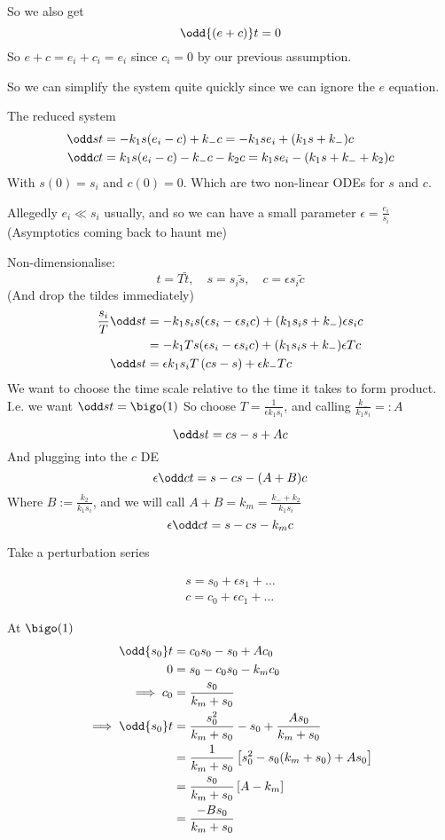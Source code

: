 \documentclass{X:/Documents/Coding/Latex/myassignment}
\begin{document}
So we also get
\[\odd{(e+c)}t = 0 \]
So $e+c = e_i+c_i = e_i$ since $c_i = 0$ by our previous assumption.

So we can simplify the system quite quickly since we can ignore the $e$ equation.


The reduced system 
\begin{align*}
	\odd st & = -k_1 s (e_i-c) + k_- c = -k_1 se_i + (k_1 s + k_-)c\\
	\odd ct & = k_1 s (e_i-c) - k_- c - k_2c = k_1 se_i - (k_1 s + k_- + k_2)c\\
\end{align*}
With $s(0) = s_i$ and $c(0) = 0$.
Which are two non-linear ODEs for $s$ and $c$.

Allegedly $e_i \ll s_i$ usually, and so we can have a small parameter $\epsilon = \frac{e_i}{s_i}$ (Asymptotics coming back to haunt me)

Non-dimensionalise:
\[t = T \tilde{t},\quad s = s_i \tilde{s}, \quad c = \epsilon s_i \tilde{c}\]
(And drop the tildes immediately)
\begin{align*}
	\frac{s_i}{T}\odd st & = -k_1 s_i s(\epsilon s_i - \epsilon s_i c) + (k_1 s_i s + k_-) \epsilon s_i c\\
	& = -k_1 T s(\epsilon s_i - \epsilon s_i c) + (k_1 s_i s + k_-) \epsilon T c\\
	\odd st &= \epsilon k_1 s_i T\left(c s - s\right) + \epsilon k_- T c
\end{align*}
We want to choose the time scale relative to the time it takes to form product. I.e. we want $\odd st = \bigo(1)$ 
So choose $T = \frac1{\epsilon k_1 s_i}$, and calling $\frac{k_-}{k_1 s_i} =:A$

\[\odd st = cs -s + A c\]
And plugging into the $c$ DE 
\[\epsilon\odd ct = s - cs - (A+B)c\]
Where $B := \frac{k_2}{k_1 s_i}$, and we will call $A+B = k_m = \frac{k_- + k_2}{k_1s_i}$
\[\epsilon\odd ct = s - cs - k_mc\]

Take a perturbation series

\begin{align*}
	s = s_0 + \epsilon s_1 + \ldots\\
	c = c_0 + \epsilon c_1 + \ldots	
\end{align*}

At $\bigo(1)$
\begin{align*}
	\odd{s_0}t &= c_0s_0 - s_0 + Ac_0\\
	0 &= s_0 - c_0s_0 - k_mc_0\\
	\implies c_0 &= \frac{s_0}{k_m + s_0}\\
	\implies \odd{s_0}t &= \frac{s_0^2}{k_m + s_0} - s_0 + \frac{As_0}{k_m+s_0}\\
	&= \frac{1}{k_m+s_0} \left[s_0^2 - s_0(k_m+s_0) + As_0\right]\\
	&= \frac{s_0}{k_m+s_0} \left[A - k_m\right]\\
	&=  \frac{-Bs_0}{k_m+s_0}
\end{align*}
\end{document}
